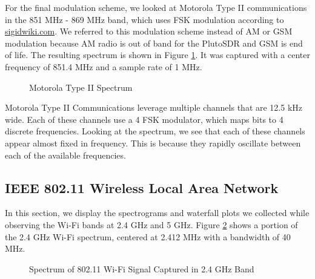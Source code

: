 \documentclass{article}
\begin{document}
For the final modulation scheme, we looked at Motorola Type II communications in the 851 MHz - 869 MHz band, which uses FSK modulation according to \url{sigidwiki.com}. We referred to this modulation scheme instead of AM or GSM modulation because AM radio is out of band for the PlutoSDR and GSM is end of life. The resulting spectrum is shown in Figure \ref{fig::police_radio_spectrum}. It was captured with a center frequency of 851.4 MHz and a sample rate of 1 MHz.

\begin{figure}[H]
	\centerline{}
	\caption{Motorola Type II Spectrum}
	\label{fig::police_radio_spectrum}
\end{figure}

Motorola Type II Communications leverage multiple channels that are 12.5 kHz wide. Each of these channels use a 4 FSK modulator, which maps bits to 4 discrete frequencies. Looking at the spectrum, we see that each of these channels appear almost fixed in frequency. This is because they rapidly oscillate between each of the available frequencies.

\subsection{IEEE 802.11 Wireless Local Area Network}

In this section, we display the spectrograms and waterfall plots we collected while observing the Wi-Fi bands at 2.4 GHz and 5 GHz. Figure \ref{fig::2_412_wifi_spectrum} shows a portion of the 2.4 GHz Wi-Fi spectrum, centered at 2.412 MHz with a bandwidth of 40 MHz.

\begin{figure}[H]
	\centerline{}
	\caption{Spectrum of 802.11 Wi-Fi Signal Captured in 2.4 GHz Band}
	\label{fig::2_412_wifi_spectrum}
\end{figure}
\end{document}
